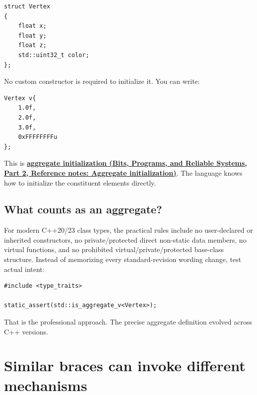 \begin{verbatim}
struct Vertex
{
    float x;
    float y;
    float z;
    std::uint32_t color;
};
\end{verbatim}

No custom constructor is required to initialize it. You can write:

\begin{verbatim}
Vertex v{
    1.0f,
    2.0f,
    3.0f,
    0xFFFFFFFFu
};
\end{verbatim}

This is \textbf{\href{../01-Bits-Programs-and-Reliable-Systems-P02/main.pdf\#appendix-b7174c179542}{aggregate initialization (Bits, Programs, and Reliable Systems, Part 2, Reference notes: Aggregate initialization)}}. The language knows how to initialize the constituent elements directly.

\subsection{What counts as an aggregate?}\label{05-engine-i-ch003-what-counts-as-an-aggregate}

\hypertarget{05-engine-i-ch003-what-counts-as-an-aggregate}{}

For modern C++20/23 class types, the practical rules include no user-declared or inherited constructors, no private/protected direct non-static data members, no virtual functions, and no prohibited virtual/private/protected base-class structure. Instead of memorizing every standard-revision wording change, test actual intent:

\begin{verbatim}
#include <type_traits>

static_assert(std::is_aggregate_v<Vertex>);
\end{verbatim}

That is the professional approach. The precise aggregate definition evolved across C++ versions.

\section{Similar braces can invoke different mechanisms}\label{05-engine-i-ch003-similar-braces-can-invoke-different-mechanisms}

\hypertarget{05-engine-i-ch003-similar-braces-can-invoke-different-mechanisms}{}

